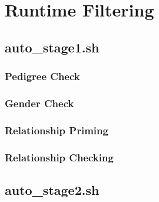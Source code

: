 %
%



\section{Runtime Filtering}

\subsection{auto\_stage1.sh}
\subsubsection{Pedigree Check}
\subsubsection{Gender Check}
\subsubsection{Relationship Priming}
\subsubsection{Relationship Checking}

\subsection{auto\_stage2.sh}
